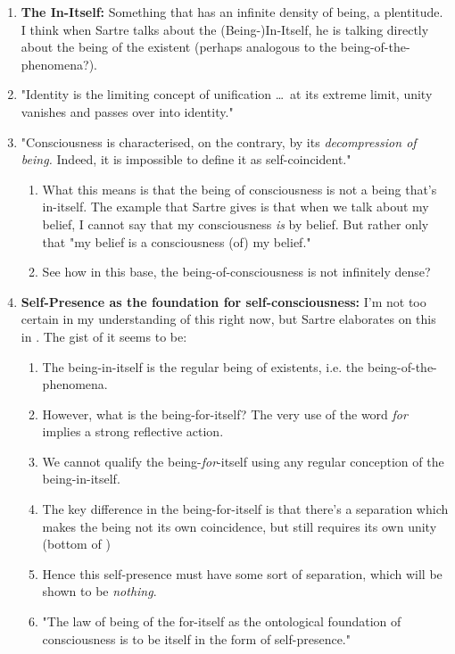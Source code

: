 \begin{enumerate}
  \item \textbf{The In-Itself:} Something that has an infinite density of being, a plentitude. I think when Sartre talks about the (Being-)In-Itself, he is talking directly about the being of the existent (perhaps analogous to the being-of-the-phenomena?).
  \item\leftprotrusion"Identity is the limiting concept of unification \ldots\ at its extreme limit, unity vanishes and passes over into identity." \autocite[123]{sartre}
  \item\leftprotrusion"Consciousness is characterised, on the contrary, by its \emph{decompression of being.} Indeed, it is impossible to define it as self-coincident." \autocite[123]{sartre}
  \begin{enumerate}
    \item What this means is that the being of consciousness is not a being that's in-itself. The example that Sartre gives is that when we talk about my belief, I cannot say that my consciousness \emph{is} by belief. But rather only that "my belief is a consciousness (of) my belief." \autocite[123]{sartre}
    \item See how in this base, the being-of-consciousness is not infinitely dense?
  \end{enumerate}
  \item \textbf{Self-Presence as the foundation for self-consciousness:} I'm not too certain in my understanding of this right now, but Sartre elaborates on this in \autocite[126]{sartre}. The gist of it seems to be:
  \begin{enumerate}
    \item The being-in-itself is the regular being of existents, i.e. the being-of-the-phenomena.
    \item However, what is the being-for-itself? The very use of the word \emph{for} implies a strong reflective action.
    \item We cannot qualify the being-\emph{for}-itself using any regular conception of the being-in-itself.
    \item The key difference in the being-for-itself is that there's a separation which makes the being not its own coincidence, but still requires its own unity (bottom of \autocite[126]{sartre})
    \item Hence this self-presence must have some sort of separation, which will be shown to be \emph{nothing}.
    \item "The law of being of the for-itself as the ontological foundation of consciousness is to be itself in the form of self-presence." \autocite[126]{sartre}

\end{enumerate}
\end{enumerate}

